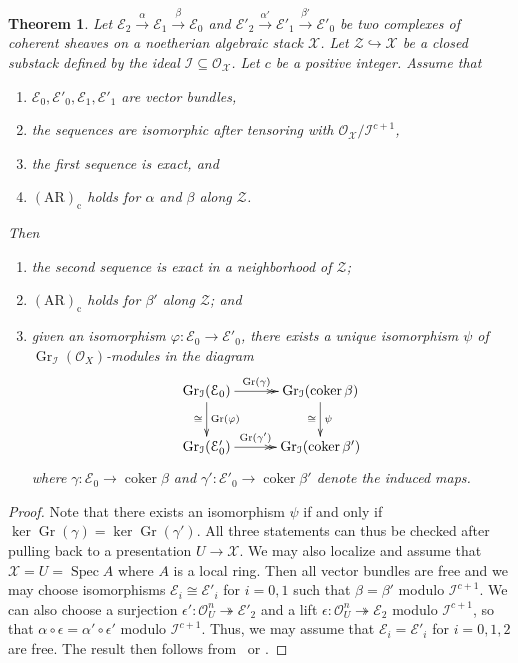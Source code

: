 \documentclass[a4paper]{amsart}
\theoremstyle{plain}
\newtheorem{theorem}{Theorem}[section]
\theoremstyle{definition}
\theoremstyle{remark}
\numberwithin{equation}{section}
\newcommand{\inj}{\hookrightarrow} %
\newcommand{\surj}{\twoheadrightarrow} %
\newcommand{\stX}{\mathcal{X}} %
\newcommand{\stZ}{\mathcal{Z}} %
\newcommand{\sE}{\mathcal{E}} %
\newcommand{\sI}{\mathcal{I}} %
\newcommand{\AR}[1]{\mathrm{(AR)_{#1}}} %
\DeclareMathOperator{\Gr}{Gr} %
\newcommand\cX{\mathcal{X}}
\newcommand\oh{\mathcal{O}}
\DeclareMathOperator{\Spec}{Spec}
\newcommand{\spref}[1]{\href{http://stacks.math.columbia.edu/tag/#1}{#1}}
\DeclareMathOperator{\coker}{coker}
\begin{document}
\begin{theorem}\label{T:Artin-Rees}
Let $\sE_2\xrightarrow{\alpha} \sE_1\xrightarrow{\beta} \sE_0$
and $\sE'_2\xrightarrow{\alpha'} \sE'_1\xrightarrow{\beta'} \sE'_0$
be two complexes of coherent sheaves on a noetherian algebraic stack $\cX$.  Let $\stZ\inj \stX$ be a closed
substack defined by the ideal $\sI\subseteq \oh_\stX$.  Let $c$ be a positive integer. Assume
that
\begin{enumerate}
\item $\sE_0,\sE'_0,\sE_1,\sE'_1$ are vector bundles,
\item the sequences are isomorphic after tensoring with $\oh_{\cX}/\sI^{c+1}$,
\item the first sequence is exact, and
\item $\AR{c}$ holds for $\alpha$ and $\beta$ along $\stZ$.
\end{enumerate}
Then
\begin{enumerate}[label=(\alph*)]
\item the second sequence is exact in a neighborhood of $\stZ$;
\item $\AR{c}$ holds for $\beta'$ along $\stZ$; and
\item given an isomorphism $\varphi\colon \sE_0\to \sE'_0$, there exists a
  unique isomorphism $\psi$ of $\Gr_\sI(\oh_X)$-modules in the diagram
\[
\xymatrix@C+2mm{
\Gr_\sI(\sE_0)\ar@{->>}[r]^-{\Gr(\gamma)}\ar[d]^{\Gr(\varphi)}_{\cong}
 & \Gr_\sI(\coker \beta)\ar[d]^{\psi}_{\cong} \\
\Gr_\sI(\sE'_0)\ar@{->>}[r]^-{\Gr(\gamma')}
 & \Gr_\sI(\coker \beta')
}%
\]
where $\gamma\colon \sE_0\to \coker \beta$ and
$\gamma'\colon \sE'_0\to \coker \beta'$ denote the induced maps.
\end{enumerate}
\end{theorem}
\begin{proof}
Note that there exists an isomorphism $\psi$ if and only if $\ker
\Gr(\gamma)=\ker \Gr(\gamma')$.  All three statements can thus be checked after
pulling back to a presentation $U\to \stX$. We may also localize and assume
that $\stX=U=\Spec A$ where $A$ is a local ring. Then all vector bundles are
free and we may choose isomorphisms $\sE_i\cong\sE'_i$ for $i=0,1$ such that
$\beta=\beta'$ modulo $\sI^{c+1}$. We can also choose a surjection $\epsilon'\colon \oh_U^n\surj
\sE'_2$ and a lift $\epsilon\colon \oh_U^n\surj \sE_2$ modulo $\sI^{c+1}$, so that
$\alpha\circ\epsilon=\alpha'\circ\epsilon'$ modulo $\sI^{c+1}$. Thus, we may assume that $\sE_i=\sE'_i$ for
$i=0,1,2$ are free. The result then follows from~\cite[Lem.~3.1 and
  Thm.~3.2]{conrad-dejong} or \cite[Tags~\spref{07VE} and
  \spref{07VF}]{stacks-project}.
\end{proof}
\end{document}
